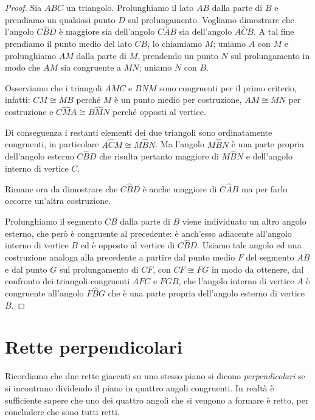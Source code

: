 \begin{proof}
Sia $ABC$ un triangolo. Prolunghiamo il lato $AB$ dalla parte di $B$ e prendiamo un qualsiasi punto $D$ sul prolungamento. Vogliamo dimostrare che l'angolo $C\widehat{B}D$ è maggiore sia dell'angolo $C\widehat{A}B$ sia dell'angolo $A\widehat{C}B$. A tal fine prendiamo il punto medio del lato $CB$, lo chiamiamo $M$; uniamo $A$ con $M$ e prolunghiamo $AM$ dalla parte di $M$, prendendo un punto $N$ sul prolungamento in modo che $AM$ sia congruente a $MN$; uniamo $N$ con $B$.

Osserviamo che i triangoli $AMC$ e $BNM$ sono congruenti per il primo criterio, infatti: $CM\cong MB$ perché $M$ è un punto medio per costruzione, $AM\cong MN$ per costruzione e $C\widehat{M}A\cong B\widehat{M}N$ perché opposti al vertice.

Di conseguenza i restanti elementi dei due triangoli sono ordinatamente congruenti, in particolare $A\widehat{C}M\cong M\widehat{B}N$. Ma l'angolo $M\widehat{B}N$ è una parte propria dell'angolo esterno $C\widehat{B}D$ che risulta pertanto maggiore di $M\widehat{B}N$ e dell'angolo interno di vertice $C$.

Rimane ora da dimostrare che $C\widehat{B}D$ è anche maggiore di $C\widehat{A}B$ ma per farlo occorre un'altra costruzione.

Prolunghiamo il segmento $CB$ dalla parte di $B$ viene individuato un altro angolo esterno, che però è congruente al precedente: è anch'esso adiacente all'angolo interno di vertice $B$ ed è opposto al vertice di $C\widehat{B}D$. Usiamo tale angolo ed una costruzione analoga alla precedente a partire dal punto medio $F$ del segmento $AB$ e dal punto $G$ sul prolungamento di $CF$, con $CF\cong FG$ in modo da ottenere, dal confronto dei triangoli congruenti $AFC$ e $FGB$, che l'angolo interno di vertice $A$ è congruente all'angolo $F\widehat{B}G$ che è una parte propria dell'angolo esterno di vertice $B$.
\end{proof}

\section{Rette perpendicolari}

Ricordiamo che due rette giacenti su uno stesso piano si dicono \emph{perpendicolari} se si incontrano dividendo il piano in quattro angoli congruenti. In realtà è sufficiente sapere che uno dei quattro angoli che si vengono a formare è retto, per concludere che sono tutti retti.

